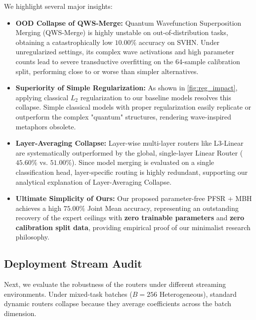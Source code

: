 We highlight several major insights:
\begin{itemize}
    \item \textbf{OOD Collapse of QWS-Merge:} Quantum Wavefunction Superposition Merging (QWS-Merge) is highly unstable on out-of-distribution tasks, obtaining a catastrophically low $10.00\%$ accuracy on SVHN. Under unregularized settings, its complex wave activations and high parameter counts lead to severe transductive overfitting on the 64-sample calibration split, performing close to or worse than simpler alternatives.
    \item \textbf{Superiority of Simple Regularization:} As shown in \cref{fig:reg_impact}, applying classical $L_2$ regularization to our baseline models resolves this collapse. Simple classical models with proper regularization easily replicate or outperform the complex "quantum" structures, rendering wave-inspired metaphors obsolete.
    \item \textbf{Layer-Averaging Collapse:} Layer-wise multi-layer routers like L3-Linear are systematically outperformed by the global, single-layer Linear Router ($45.60\%$ vs. $51.00\%$). Since model merging is evaluated on a single classification head, layer-specific routing is highly redundant, supporting our analytical explanation of Layer-Averaging Collapse.
    \item \textbf{Ultimate Simplicity of Ours:} Our proposed parameter-free PFSR + MBH achieves a high $75.00\%$ Joint Mean accuracy, representing an outstanding recovery of the expert ceilings with \textbf{zero trainable parameters} and \textbf{zero calibration split data}, providing empirical proof of our minimalist research philosophy.
\end{itemize}

\subsection{Deployment Stream Audit}
Next, we evaluate the robustness of the routers under different streaming environments. Under mixed-task batches ($B=256$ Heterogeneous), standard dynamic routers collapse because they average coefficients across the batch dimension.

